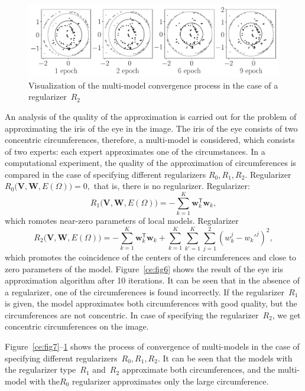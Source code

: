\begin{figure}
     \includegraphics[width=\textwidth]{experiment_real_regular}
     \caption{Visualization of the multi-model convergence process in the case of a regularizer~$R_2$}
    \label{ce:fig9}
\end{figure}

An analysis of the quality of the approximation is carried out for the problem of approximating the iris of the eye in the image. The iris of the eye consists of two concentric circumferences, therefore, a multi-model is considered, which consists of two experts: each expert approximates one of the circumstances. In a computational experiment, the quality of the approximation of circumferences is compared in the case of specifying different regularizers $R_0, R_1, R_2$. Regularizer$R_0\bigl(\mathbf{V}, \mathbf{W}, E(\Omega)\bigr)=0,$ that is, there is no regularizer. Regularizer:
\[
R_1\bigl(\mathbf{V}, \mathbf{W}, E(\Omega)\bigr)= -\sum_{k=1}^{K}\mathbf{w}_k^{\mathsf{T}}\mathbf{w}_k,
\]
which romotes near-zero parameters of local models.
Regularizer 
\[
R_2\bigl(\mathbf{V}, \mathbf{W}, E(\Omega)\bigr)= -\sum_{k=1}^{K}\mathbf{w}_k^{\mathsf{T}}\mathbf{w}_k + \sum_{k=1}^{K}\sum_{k'=1}^{K}\sum_{j=1}^2\left(w_k^j-w_k'^j\right)^2,\]
which promotes the coincidence of the centers of the circumferences and close to zero parameters of the model.
Figure~\ref{ce:fig6} shows the result of the eye iris approximation algorithm after 10 iterations. It can be seen that in the absence of a regularizer, one of the circumferences is found incorrectly. If the regularizer~$R_1 $ is given, the model approximates both circumferences with good quality, but the circumferences are not concentric. In case of specifying the regularizer~$R_2$, we get concentric circumferences on the image.

Figure~\ref{ce:fig7}--\ref{ce:fig9} shows the process of convergence of multi-models in the case of specifying different regularizers~$R_0, R_1, R_2$. It can be seen that the models with the regularizer type~$R_1$ and~$R_2$ approximate both circumferences, and the multi-model with the$R_0$ regularizer approximates only the large circumference.


